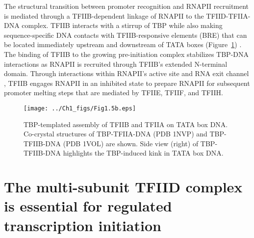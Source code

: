 \indent The structural transition between promoter recognition and RNAPII recruitment is mediated through a TFIIB-dependent linkage of RNAPII to the TFIID-TFIIA-DNA complex. TFIIB interacts with a stirrup of TBP while also making sequence-specific DNA contacts with TFIIB-responsive elements (BRE) that can be located immediately upstream and downstream of TATA boxes (Figure~\ref{fig:Fig1.5}) \cite{Lagrange_2618, Nikolov_3177}. The binding of TFIIB to the growing pre-initiation complex stabilizes TBP-DNA interactions as RNAPII is recruited through TFIIB's extended N-terminal domain. Through interactions within RNAPII's active site and RNA exit channel \cite{Kostrewa_659}, TFIIB engages RNAPII in an inhibited state to prepare RNAPII for subsequent promoter melting steps that are mediated by TFIIE, TFIIF, and TFIIH. \\
\begin{figure}
\centering
\texttt{[image: ../Ch1\_figs/Fig1.5b.eps]}
\caption[TBP-templated assembly of TFIIB and TFIIA on TATA box DNA]{TBP-templated assembly of TFIIB and TFIIA on TATA box DNA. Co-crystal structures of TBP-TFIIA-DNA (PDB 1NVP) \cite{Bleichenbacher_2003} and TBP-TFIIB-DNA (PDB 1VOL) \cite{Nikolov_3177} are shown.  Side view (right) of TBP-TFIIB-DNA highlights the TBP-induced kink in TATA box DNA.}
\label{fig:Fig1.5}
\end{figure}


\section{The multi-subunit TFIID complex is essential for regulated transcription initiation}

